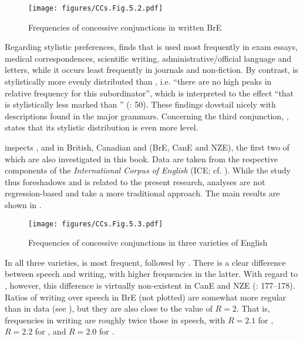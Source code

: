 \begin{figure}
\texttt{[image: figures/CCs.Fig.5.2.pdf]}
\caption{\label{bkm:Ref471516304}\label{fig:5.2}Frequencies of concessive conjunctions in written BrE \citep{Aarts1988} }
 \end{figure}

Regarding stylistic preferences, \citet[47–48]{Aarts1988} finds that  is used most frequently in exam essays, medical correspondences, scientific writing, administrative/official language and letters, while it occurs least frequently in journals and non-fiction. By contrast,  is stylistically more evenly distributed than , i.e. “there are no high peaks in relative frequency for this subordinator”, which is interpreted to the effect “that  is stylistically less marked than ” (\citealt{Aarts1988}: 50). These findings dovetail nicely with descriptions found in the major grammars. Concerning the third conjunction, , \citet[50]{Aarts1988} states that its stylistic distribution is even more level.

\citet{Schützler2017} inspects ,  and  in British, Canadian and  (BrE, CanE and NZE), the first two of which are also investigated in this book. Data are taken from the respective components of the \textit{International Corpus of English} (ICE; cf. ). While the study thus foreshadows and is related to the present research, analyses are not regression-based and take a more traditional approach. The main results are shown in .

\begin{figure}
\texttt{[image: figures/CCs.Fig.5.3.pdf]}
\caption{\label{bkm:Ref35585270}\label{fig:5.3}Frequencies of concessive conjunctions in three varieties of English \citep{Schützler2017}}
 \end{figure}

In all three varieties,  is most frequent, followed by . There is a clear difference between speech and writing, with higher frequencies in the latter. With regard to , however, this difference is virtually non-existent in CanE and NZE (\citealt{Schützler2017}: 177–178). Ratios of writing over speech in BrE (not plotted) are somewhat more regular than in  data (see ), but they are also close to the value of $R=2$. That is, frequencies in writing are roughly twice those in speech, with $R=2.1$ for , $R=2.2$ for , and $R=2.0$ for .

